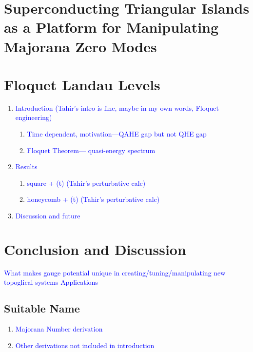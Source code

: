 \documentclass[12pt,doctor]{thesis}
\newcommand{\Blue}[1]{\textcolor{blue}{#1}}
\renewcommand{\vec}[1]{\mathbf{#1}}
\begin{document}
\chapter{Superconducting Triangular Islands as a Platform for Manipulating Majorana Zero Modes}







\chapter{Floquet Landau Levels}

\begin{enumerate}
  \item \Blue{Introduction (Tahir's intro is fine, maybe in my own words, Floquet engineering)}
  \begin{enumerate}[i]
    \item \Blue{Time dependent, motivation---QAHE gap but not QHE gap}
    \item \Blue{Floquet Theorem--- quasi-energy spectrum}
  \end{enumerate}
  \item \Blue{Results}
  \begin{enumerate}[i]
    \item \Blue{square + \vec{A}(t) (Tahir's perturbative calc)}
    \item \Blue{honeycomb + \vec{A}(t) (Tahir's perturbative calc)}
  \end{enumerate}
  \item \Blue{Discussion and future}
\end{enumerate}

\chapter{Conclusion and Discussion}

\Blue{What makes gauge potential unique in creating/tuning/manipulating new topoglical systems}
\Blue{Applications}

\begin{appendices}
\chapter{Suitable Name}
\begin{enumerate}
  \item \Blue{Majorana Number derivation}
  \item \Blue{Other derivations not included in introduction}
\end{enumerate}
\end{appendices}


\end{document}
